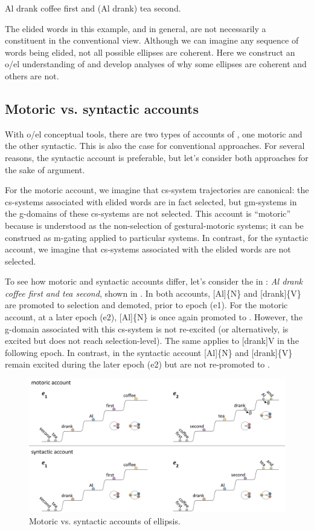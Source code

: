 \ea\label{ex:7:1x}
  {Al drank coffee first and} (Al drank) tea second.
\z

  The elided words in this example, and in general, are not necessarily a constituent in the conventional view. Although we can imagine any sequence of words being elided, not all possible ellipses are coherent. Here we construct an o/el understanding of  and develop analyses of why some ellipses are coherent and others are not.

\subsection{Motoric vs. syntactic accounts}

With o/el conceptual tools, there are two types of accounts of , one motoric and the other syntactic. This is also the case for conventional approaches. For several reasons, the syntactic account is preferable, but let's consider both approaches for the sake of argument. 

  For the motoric account, we imagine that cs-system trajectories are canonical: the cs-systems associated with elided words are in fact selected, but gm-systems in the g-domains of these cs-systems are not selected. This account is “motoric” because  is understood as the non-selection of gestural-motoric systems; it can be construed as m-gating applied to particular systems. In contrast, for the syntactic account, we imagine that cs-systems associated with the elided words are not selected.

  To see how motoric and syntactic accounts differ, let's consider the   in : \textit{Al drank coffee first and tea second}, shown in {}. In both accounts, [Al]\{N\} and [drank]\{V\} are promoted to selection and demoted, prior to epoch (e1). For the motoric account, at a later epoch (e2), [Al]\{N\} is once again promoted to . However, the g-domain associated with this cs-system is not re-excited (or alternatively, is excited but does not reach selection-level). The same applies to [drank]{V} in the following epoch. In contrast, in the syntactic account [Al]\{N\} and [drank]\{V\} remain excited during the later epoch (e2) but are not re-promoted to . 

  
\begin{figure}
\includegraphics[width=\textwidth]{figures/Tilsen-img145.png}
\caption{Motoric vs. syntactic accounts of ellipsis.}
\label{fig:7:1}
\end{figure}
 

